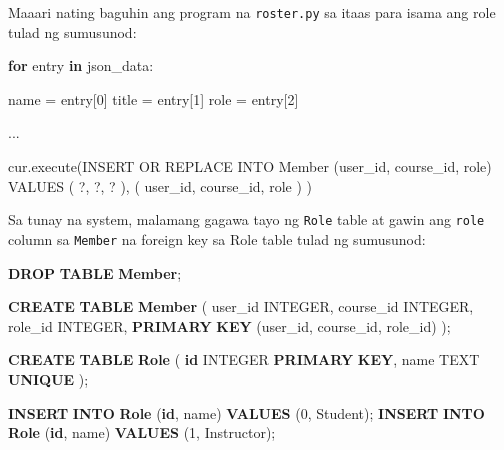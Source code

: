 \documentclass[10pt,]{book}
\newenvironment{Shaded}{}{}
\newcommand{\ControlFlowTok}[1]{\textcolor[rgb]{0.00,0.44,0.13}{\textbf{#1}}}
\newcommand{\DataTypeTok}[1]{\textcolor[rgb]{0.56,0.13,0.00}{#1}}
\newcommand{\DecValTok}[1]{\textcolor[rgb]{0.25,0.63,0.44}{#1}}
\newcommand{\KeywordTok}[1]{\textcolor[rgb]{0.00,0.44,0.13}{\textbf{#1}}}
\newcommand{\NormalTok}[1]{#1}
\newcommand{\OperatorTok}[1]{\textcolor[rgb]{0.40,0.40,0.40}{#1}}
\newcommand{\StringTok}[1]{\textcolor[rgb]{0.25,0.44,0.63}{#1}}
\begin{document}
Maaari nating baguhin ang program na \texttt{roster.py} sa itaas para
isama ang role tulad ng sumusunod:

\begin{Shaded}
\begin{Highlighting}[]
\ControlFlowTok{for}\NormalTok{ entry }\KeywordTok{in}\NormalTok{ json\_data:}

\NormalTok{    name }\OperatorTok{=}\NormalTok{ entry[}\DecValTok{0}\NormalTok{]}
\NormalTok{    title }\OperatorTok{=}\NormalTok{ entry[}\DecValTok{1}\NormalTok{]}
\NormalTok{    role }\OperatorTok{=}\NormalTok{ entry[}\DecValTok{2}\NormalTok{]}

\NormalTok{    ...}

\NormalTok{    cur.execute(}\StringTok{\textquotesingle{}\textquotesingle{}\textquotesingle{}INSERT OR REPLACE INTO Member}
\StringTok{        (user\_id, course\_id, role) VALUES ( ?, ?, ? )\textquotesingle{}\textquotesingle{}\textquotesingle{}}\NormalTok{,}
\NormalTok{        ( user\_id, course\_id, role ) )}
\end{Highlighting}
\end{Shaded}

Sa tunay na system, malamang gagawa tayo ng \texttt{Role} table at gawin
ang \texttt{role} column sa \texttt{Member} na foreign key sa Role table
tulad ng sumusunod:

\begin{Shaded}
\begin{Highlighting}[]
\KeywordTok{DROP} \KeywordTok{TABLE} \KeywordTok{Member}\NormalTok{;}

\KeywordTok{CREATE} \KeywordTok{TABLE} \KeywordTok{Member}\NormalTok{ (}
\NormalTok{    user\_id     }\DataTypeTok{INTEGER}\NormalTok{,}
\NormalTok{    course\_id   }\DataTypeTok{INTEGER}\NormalTok{,}
\NormalTok{    role\_id     }\DataTypeTok{INTEGER}\NormalTok{,}
    \KeywordTok{PRIMARY} \KeywordTok{KEY}\NormalTok{ (user\_id, course\_id, role\_id)}
\NormalTok{);}

\KeywordTok{CREATE} \KeywordTok{TABLE} \KeywordTok{Role}\NormalTok{ (}
    \KeywordTok{id}          \DataTypeTok{INTEGER} \KeywordTok{PRIMARY} \KeywordTok{KEY}\NormalTok{,}
\NormalTok{    name        TEXT }\KeywordTok{UNIQUE}
\NormalTok{);}

\KeywordTok{INSERT} \KeywordTok{INTO} \KeywordTok{Role}\NormalTok{ (}\KeywordTok{id}\NormalTok{, name) }\KeywordTok{VALUES}\NormalTok{ (}\DecValTok{0}\NormalTok{, }\StringTok{\textquotesingle{}Student\textquotesingle{}}\NormalTok{);}
\KeywordTok{INSERT} \KeywordTok{INTO} \KeywordTok{Role}\NormalTok{ (}\KeywordTok{id}\NormalTok{, name) }\KeywordTok{VALUES}\NormalTok{ (}\DecValTok{1}\NormalTok{, }\StringTok{\textquotesingle{}Instructor\textquotesingle{}}\NormalTok{);}
\end{Highlighting}
\end{Shaded}
\end{document}
